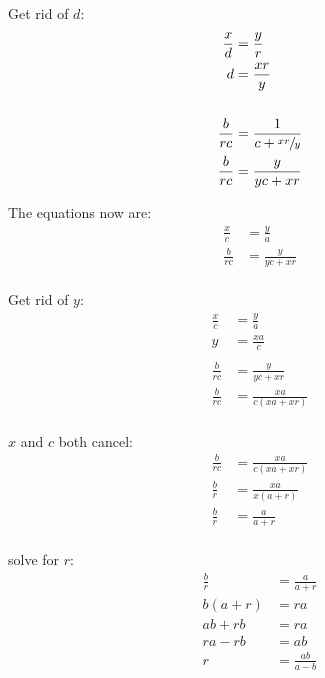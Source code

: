 \documentclass{exam}
\begin{document}
\begin{description}
\begin{parts}
          Get rid of $d$:
          \begin{align*}
            \frac{x}{d}  & = \frac{y}{r} \\
            d            & = \frac{xr}{y} \\
            \\
            \frac{b}{rc} & = \frac{1}{c + \sfrac{xr}{y}} \\
            \frac{b}{rc} & = \frac{y}{yc + xr} \\
          \end{align*}

          The equations now are:
          \begin{align*}
            \frac{x}{c}  & = \frac{y}{a} \\
            \frac{b}{rc} & = \frac{y}{yc + xr} \\
          \end{align*}

          Get rid of $y$:
          \begin{align*}
            \frac{x}{c}  & = \frac{y}{a} \\
            y            & = \frac{xa}{c} \\
            \\
            \frac{b}{rc} & = \frac{y}{yc + xr} \\
            \frac{b}{rc} & = \frac{xa}{c(xa + xr)} \\
          \end{align*}

          $x$ and $c$ both cancel:
          \begin{align*}
            \frac{b}{rc} & = \frac{xa}{c(xa + xr)} \\
            \frac{b}{r} & = \frac{xa}{x(a + r)} \\
            \frac{b}{r}  & = \frac{a}{a + r} \\
          \end{align*}

          solve for $r$:
          \begin{align*}
            \frac{b}{r} & = \frac{a}{a + r} \\
            b(a + r)    & = ra \\
            ab + rb     & = ra \\
            ra - rb     & = ab \\
            r           & = \frac{ab}{a - b} \\
          \end{align*}


\end{parts}
\end{description}
\end{document}
